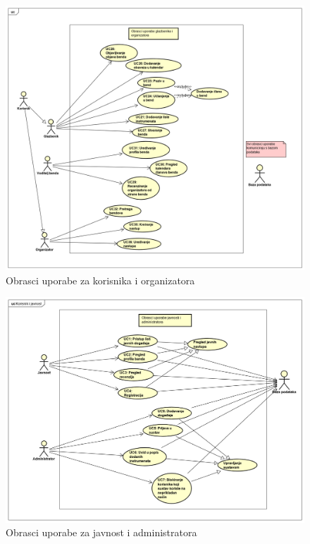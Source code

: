 				
				\begin{figure}[H]
				\begin{center}
					\includegraphics[width=15cm]{slike/glazbeni_organizator.PNG}
				\end{center}
				\caption{Obrasci uporabe za korisnika i organizatora}
				\label{fig:ou1}
			\end{figure}
		
		\begin{figure}[H]
		\begin{center}
			\includegraphics[width=15cm]{slike/javnost_admin.PNG}
		\end{center}
		\caption{Obrasci uporabe za javnost i administratora}
		\label{fig:ou2}
	\end{figure}

